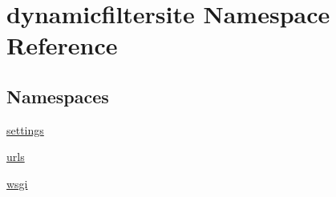 \hypertarget{namespacedynamicfiltersite}{}\section{dynamicfiltersite Namespace Reference}
\label{namespacedynamicfiltersite}
\subsection*{Namespaces}
\begin{DoxyCompactItemize}
\item 
 \hyperlink{namespacedynamicfiltersite_1_1settings}{settings}
\item 
 \hyperlink{namespacedynamicfiltersite_1_1urls}{urls}
\item 
 \hyperlink{namespacedynamicfiltersite_1_1wsgi}{wsgi}
\end{DoxyCompactItemize}
